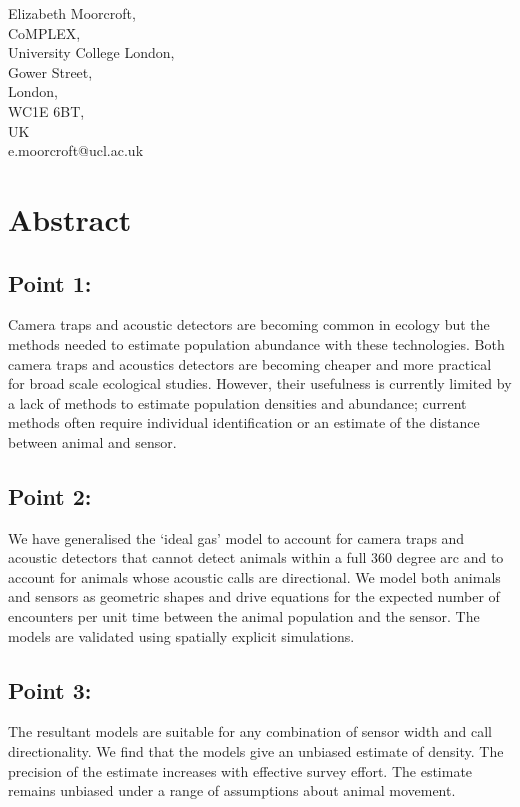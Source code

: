 \documentclass[a4paper,10pt,reqno,oneside]{amsart}
\begin{document}
Elizabeth Moorcroft,\\
CoMPLEX,\\
University College London,\\
Gower Street,\\
London,\\
WC1E 6BT, \\
UK\\
e.moorcroft@ucl.ac.uk\\


\clearpage



\section{Abstract}
\subsection*{Point 1:} Camera traps and acoustic detectors are becoming common in ecology but the methods needed to estimate population abundance with these technologies. Both camera traps and acoustics detectors are becoming cheaper and more practical for broad scale ecological studies. However, their usefulness is currently limited by a lack of methods to estimate population densities and abundance; current methods often require individual identification or an estimate of the distance between animal and sensor.

\subsection*{Point 2:} We have generalised the `ideal gas' model to account for camera traps and acoustic detectors that cannot detect animals within a full 360 degree arc and to account for animals whose acoustic calls are directional. We model both animals and sensors as geometric shapes and drive equations for the expected number of encounters per unit time between the animal population and the sensor. The models are validated using spatially explicit simulations. 

\subsection*{Point 3:} The resultant models are suitable for any combination of sensor width and call directionality. We find that the models give an unbiased estimate of density. The precision of the estimate increases with effective survey effort. The estimate remains unbiased under a range of assumptions about animal movement. 
\end{document}
